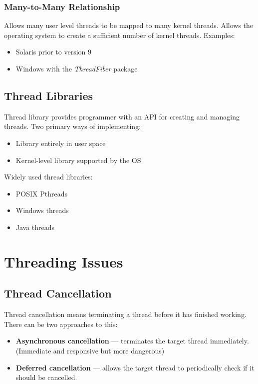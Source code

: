\documentclass{article}
\begin{document}
\subsubsection{Many-to-Many Relationship}
Allows many user level threads to be mapped to many kernel threads.
Allows the operating system to create a sufficient number of kernel threads.
Examples:
\begin{itemize}
	\item Solaris prior to version 9
	\item Windows with the \textit{ThreadFiber} package
\end{itemize}

\subsection{Thread Libraries}
Thread library provides programmer with an API for creating and managing threads.
Two primary ways of implementing:
\begin{itemize}
	\item Library entirely in user space
	\item Kernel-level library supported by the OS
\end{itemize}
Widely used thread libraries:
\begin{itemize}
	\item POSIX Pthreads
	\item Windows threads
	\item Java threads
\end{itemize}

\section{Threading Issues}
\subsection{Thread Cancellation}
Thread cancellation means terminating a thread before it has finished working.
There can be two approaches to this:
\begin{itemize}
	\item \textbf{Asynchronous cancellation} --- terminates the target thread immediately. (Immediate and responsive but more dangerous)
	\item \textbf{Deferred cancellation} --- allows the target thread to periodically check if it should be cancelled.
\end{itemize}
\end{document}

